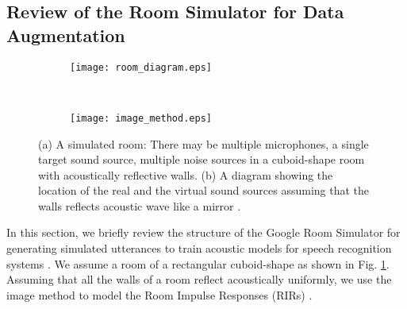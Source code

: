 \documentclass{article}
\begin{document}
\subsection{Review of the Room Simulator for Data Augmentation}
%
%
\begin{figure}
  \centering
    \begin{subfigure}{\linewidth}
      \centering
      \texttt{[image: room\_diagram.eps]}
      \caption{}
      \label{fig:room_diagram}
    \end{subfigure}
   \\
    \begin{subfigure}{\linewidth}
      \centering
      \texttt{[image: image\_method.eps]}
      \caption{}
      \label{fig:image_method}
    \end{subfigure}
    \caption{
    (a) A simulated room: There may be multiple microphones, a single target
    sound source, multiple noise sources in a cuboid-shape room with
    acoustically reflective walls. (b) A diagram showing the location
    of the real and the virtual sound sources assuming that the walls
    reflects acoustic wave like a mirror \cite{C_Kim_INTERSPEECH_2017_1}.}
  \vspace{-10mm}
\end{figure}
%
%
In this section, we briefly review the structure of the Google
Room Simulator for generating simulated utterances
to train acoustic models for speech recognition systems
\cite{C_Kim_INTERSPEECH_2017_1}. We assume a room of a
rectangular cuboid-shape as shown in Fig. \ref{fig:room_diagram}.
Assuming that all the walls of a room reflect acoustically uniformly,
we use the image method to model the Room Impulse Responses (RIRs)
\cite{J_Allen_JASA_1979, E_A_Lehmann_ASPAA_2007, S_G_McGovern_RIR}.
\end{document}
